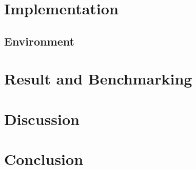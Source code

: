 \documentclass[11pt,conference]{IEEEtran}
\begin{document}
\section{Implementation}
\subsection{Environment}
\subsection{}

\section{Result and Benchmarking}


\section{Discussion}



\section{Conclusion}



\end{document}
